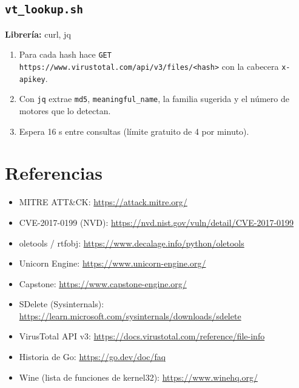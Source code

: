 \documentclass[11pt,a4paper]{article}
\begin{document}
\subsection{\texttt{vt\_lookup.sh}}
\textbf{Librería:} curl, jq
\begin{enumerate}

\item Para cada hash hace \texttt{GET https://www.virustotal.com/api/v3/files/<hash>} con la cabecera \texttt{x-apikey}.

\item Con \texttt{jq} extrae \texttt{md5}, \texttt{meaningful\_name}, la familia sugerida y el número de motores que lo detectan.

\item Espera 16 s entre consultas (límite gratuito de 4 por minuto).

\end{enumerate}



\section{Referencias}
\begin{itemize}\small
  \item MITRE ATT\&CK: \url{https://attack.mitre.org/}
  \item CVE-2017-0199 (NVD): \url{https://nvd.nist.gov/vuln/detail/CVE-2017-0199}
  \item oletools / rtfobj: \url{https://www.decalage.info/python/oletools}
  \item Unicorn Engine: \url{https://www.unicorn-engine.org/}
  \item Capstone: \url{https://www.capstone-engine.org/}
  \item SDelete (Sysinternals): \url{https://learn.microsoft.com/sysinternals/downloads/sdelete}
  \item VirusTotal API v3: \url{https://docs.virustotal.com/reference/file-info}
  \item Historia de Go: \url{https://go.dev/doc/faq}
  \item Wine (lista de funciones de kernel32): \url{https://www.winehq.org/}
\end{itemize}
\end{document}
